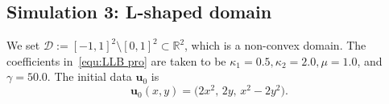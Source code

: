 \documentclass[11pt,reqno]{amsart}
\theoremstyle{definition}
\numberwithin{equation}{section}
\newcommand{\bff}{\boldsymbol}
\newcommand{\bb}{\mathbb}
\begin{document}
%



\subsection{Simulation 3: L-shaped domain}
We set $\mathscr{D}:= [-1,1]^2 \setminus [0,1]^2 \subset \bb{R}^2$, which is a non-convex domain. The coefficients in~\eqref{equ:LLB pro} are taken to be $\kappa_1=0.5, \kappa_2=2.0, \mu=1.0$, and $\gamma=50.0$. The initial data $\bff{u}_0$ is
\begin{equation*}
	\bff{u}_0(x,y)= \big(2x^2,\, 2y,\, x^2-2y^2 \big).
\end{equation*}
\end{document}
